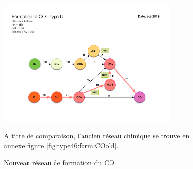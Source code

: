 \begin{figure}[!h]
    \centering \includegraphics[trim = {3cm 3cm 3cm 7cm},clip,width=0.8\textwidth]{figure/type46/ChimieCO_2.pdf}
    \caption{Nouveau réseau de formation du $\mathrm{CO}$}
    \begin{minipage}{\textwidth}
    A titre de comparaison, l'ancien réseau chimique se trouve en annexe figure \ref{fig:type46:form:COold}.
    \end{minipage}
    \label{fig:type46:form:CO}
\end{figure}







